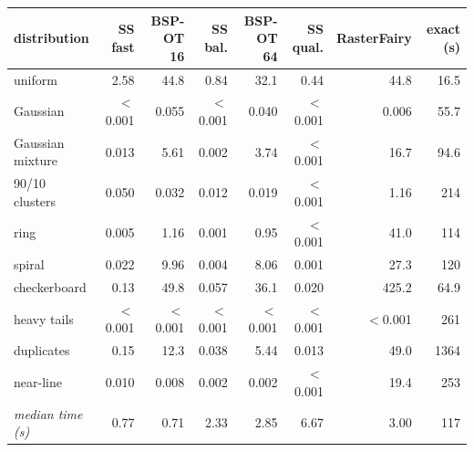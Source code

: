 \begin{tabular}{lrrrrrrr}
\toprule
distribution & SS fast & BSP-OT 16 & SS bal. & BSP-OT 64 & SS qual. & RasterFairy & exact (s) \\
\midrule
uniform & 2.58 & 44.8 & 0.84 & 32.1 & 0.44 & 44.8 & 16.5 \\
Gaussian & $<$0.001 & 0.055 & $<$0.001 & 0.040 & $<$0.001 & 0.006 & 55.7 \\
Gaussian mixture & 0.013 & 5.61 & 0.002 & 3.74 & $<$0.001 & 16.7 & 94.6 \\
90/10 clusters & 0.050 & 0.032 & 0.012 & 0.019 & $<$0.001 & 1.16 & 214 \\
ring & 0.005 & 1.16 & 0.001 & 0.95 & $<$0.001 & 41.0 & 114 \\
spiral & 0.022 & 9.96 & 0.004 & 8.06 & 0.001 & 27.3 & 120 \\
checkerboard & 0.13 & 49.8 & 0.057 & 36.1 & 0.020 & 425.2 & 64.9 \\
heavy tails & $<$0.001 & $<$0.001 & $<$0.001 & $<$0.001 & $<$0.001 & $<$0.001 & 261 \\
duplicates & 0.15 & 12.3 & 0.038 & 5.44 & 0.013 & 49.0 & 1364 \\
near-line & 0.010 & 0.008 & 0.002 & 0.002 & $<$0.001 & 19.4 & 253 \\
\midrule
\emph{median time (s)} & 0.77 & 0.71 & 2.33 & 2.85 & 6.67 & 3.00 & 117 \\
\bottomrule
\end{tabular}
